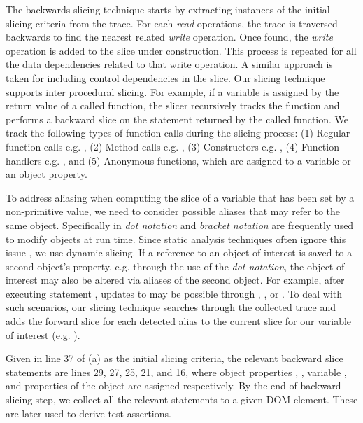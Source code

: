 The backwards slicing technique starts by extracting instances of the initial slicing criteria from the trace. For each \textit{read} operations, the trace is traversed backwards to find the nearest related \textit{write} operation. Once found, the \textit{write} operation is added to the slice under construction. This process is repeated for all the data dependencies related to that write operation. A similar approach is taken for including control dependencies in the slice. 
Our slicing technique supports inter procedural slicing. For example, if a variable is assigned by the return value of a called function, the slicer recursively tracks the function and performs a backward slice on the statement returned by the called function.
We track the following types of function calls during the slicing process: (1) Regular function calls e.g. , (2) Method calls e.g. ,
(3) Constructors e.g. , (4) Function handlers e.g. , 
and (5) Anonymous functions, which are assigned to a variable or an object property.
  
To address aliasing when computing the slice of a variable that has been set by a non-primitive value, we need to consider possible aliases that may refer to the same object. Specifically in \javascript \textit{dot notation} and \textit{bracket notation} are frequently used to modify objects at run time. Since static analysis techniques often ignore this issue \cite{Feldthaus:icse13}, we use dynamic slicing. If a reference to an object of interest is saved to a second object's property, e.g. through the use of the \textit{dot notation}, the object of interest may also be altered via aliases of the second object. For example, after executing statement , updates to  may be possible through , , or . To deal with such scenarios, our slicing technique searches through the collected trace and adds the forward slice for each detected alias to the current slice for our variable of interest (e.g. ). 

Given  in line 37 of (a) as the initial slicing criteria, the relevant backward slice statements are lines 29, 27, 25, 21, and 16, where object properties , , variable , and properties of the object  are assigned respectively.
By the end of backward slicing step, we collect all the relevant statements to a given DOM element. These are later used to derive test assertions.    